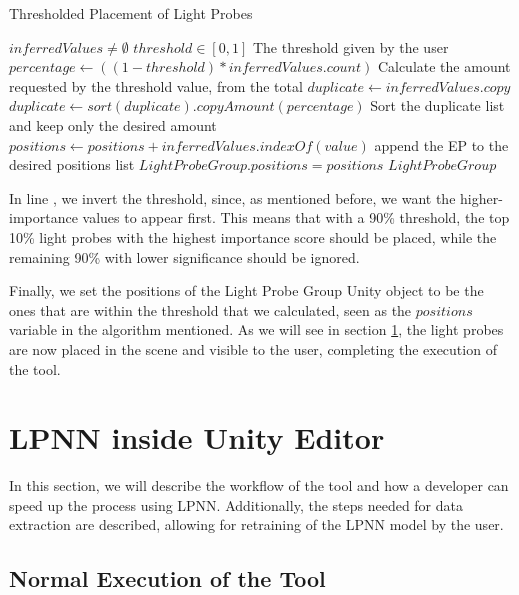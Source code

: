 \begin{algorithm}
	\caption{Thresholded Placement of Light Probes}
	\label{alg:lp_thres}
	\begin{algorithmic}[1]
		\Require $inferredValues \neq \emptyset$
		\Require $threshold \in [0, 1]$
		\Comment The threshold given by the user
		\State $percentage \gets ((1-threshold) * inferredValues.count)$
		\Comment Calculate the amount requested by the threshold value, from the total
		\label{alg:lp_thres:1}
		\State $duplicate \gets inferredValues.copy$
		\State $duplicate \gets sort(duplicate).copyAmount(percentage)$
		\Comment Sort the duplicate list and keep only the desired amount
			\State $positions \gets positions + inferredValues.indexOf(value)$
			\Comment append the EP to the desired positions list
		\EndFor
		\State $LightProbeGroup.positions = positions$
		\State \Return $Light Probe Group$
	\end{algorithmic}
\end{algorithm}

In line , we invert the threshold, since, as mentioned before, we want the higher-importance values to appear first. This means that with a 90\% threshold, the top 10\% light probes with the highest importance score should be placed, while the remaining 90\% with lower significance should be ignored.\newline 

Finally, we set the positions of the Light Probe Group Unity object to be the ones that are within the threshold that we calculated, seen as the $positions$ variable in the algorithm mentioned. As we will see in section \ref{sec:LPNN_UI}, the light probes are now placed in the scene and visible to the user, completing the execution of the tool.

\section{LPNN inside Unity Editor}
\label{sec:LPNN_UI}

In this section, we will describe the workflow of the tool and how a developer can speed up the process using LPNN. Additionally, the steps needed for data extraction are described, allowing for retraining of the LPNN model by the user.

\subsection{Normal Execution of the Tool}
\label{sec:LPNN_UI:normal}

